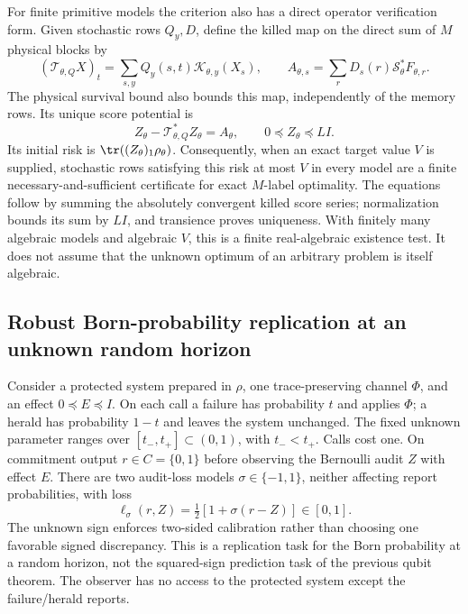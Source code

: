 For finite primitive models the criterion also has a direct operator verification form. Given stochastic rows $Q_y,D$, define the killed map on the direct sum of $M$ physical blocks by
\[
 (\mathcal T_{\theta,Q}X)_t
      =\sum_{s,y}Q_y(s,t)\mathcal K_{\theta,y}(X_s),
 \qquad A_{\theta,s}=\sum_rD_s(r)\mathcal S_\theta^*F_{\theta,r}.
\]
The physical survival bound also bounds this map, independently of the memory rows. Its unique score potential is
\begin{equation}\label{eq:positive-score-certificate}
 Z_\theta-\mathcal T_{\theta,Q}^*Z_\theta=A_\theta,
 \qquad 0\preccurlyeq Z_\theta\preccurlyeq LI.
\end{equation}
Its initial risk is $\tr((Z_\theta)_1\rho_\theta)$. Consequently, when an exact target value $V$ is supplied, stochastic rows satisfying this risk at most $V$ in every model are a finite necessary-and-sufficient certificate for exact $M$-label optimality. The equations follow by summing the absolutely convergent killed score series; normalization bounds its sum by $LI$, and transience proves uniqueness. With finitely many algebraic models and algebraic $V$, this is a finite real-algebraic existence test. It does not assume that the unknown optimum of an arbitrary problem is itself algebraic.

\subsection{Robust Born-probability replication at an unknown random horizon}
Consider a protected system prepared in $\rho$, one trace-preserving channel $\Phi$, and an effect $0\preccurlyeq E\preccurlyeq I$. On each call a failure has probability $t$ and applies $\Phi$; a herald has probability $1-t$ and leaves the system unchanged. The fixed unknown parameter ranges over $[t_-,t_+]\subset(0,1)$, with $t_-<t_+$. Calls cost one. On commitment output $r\in C=\{0,1\}$ before observing the Bernoulli audit $Z$ with effect $E$. There are two audit-loss models $\sigma\in\{-1,1\}$, neither affecting report probabilities, with loss
\begin{equation}\label{eq:calibration-loss}
 \ell_\sigma(r,Z)=\tfrac12[1+\sigma(r-Z)]\in[0,1].
\end{equation}
The unknown sign enforces two-sided calibration rather than choosing one favorable signed discrepancy. This is a replication task for the Born probability at a random horizon, not the squared-sign prediction task of the previous qubit theorem. The observer has no access to the protected system except the failure/herald reports.

